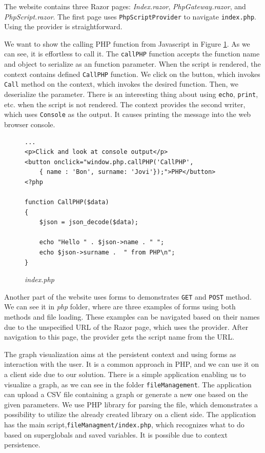 The website contains three Razor pages: \textit{Index.razor}, \textit{PhpGateway.razor}, and \textit{PhpScript.razor}.
The first page uses \texttt{PhpScriptProvider} to navigate \texttt{index.php}.
Using the provider is straightforward.
\par
We want to show the calling PHP function from Javascript in Figure \ref{img26:index}.
As we can see, it is effortless to call it.
The \texttt{callPHP} function accepts the function name and object to serialize as an function parameter.
When the script is rendered, the context contains defined \texttt{CallPHP} function.
We click on the button, which invokes \texttt{Call} method on the context, which invokes the desired function.
Then, we deserialize the parameter.
There is an interesting thing about using \texttt{echo}, \texttt{print}, etc. when the script is not rendered.
The context provides the second writer, which uses \texttt{Console} as the output.
It causes printing the message into the web browser console.
\begin{figure}
\begin{lstlisting}
...
<p>Click and look at console output</p>
<button onclick="window.php.callPHP('CallPHP',
	{ name : 'Bon', surname: 'Jovi'});">PHP</button>
<?php

function CallPHP($data)
{
    $json = json_decode($data); 

	echo "Hello " . $json->name . " ";
	echo $json->surname .  " from PHP\n";
}
\end{lstlisting}
\caption{\textit{index.php}}
\label{img26:index}
\end{figure}
\par
Another part of the website uses forms to demonstrates \texttt{GET} and \texttt{POST} method.
We can see it in \textit{php} folder, where are three examples of forms using both methods and file loading.
These examples can be navigated based on their names due to the unspecified URL of the Razor page, which uses the provider.
After navigation to this page, the provider gets the script name from the URL.
\par
The graph visualization aims at the persistent context and using forms as interaction with the user.
It is a common approach in PHP, and we can use it on a client side due to our solution.
There is a simple application enabling us to visualize a graph, as we can see in the folder \texttt{fileManagement}.
The application can upload a CSV file containing a graph or generate a new one based on the given parameters.
We use PHP library for parsing the file, which demonstrates a possibility to utilize the already created library on a client side.
The application has the main script,\texttt{fileManagment/index.php}, which recognizes what to do based on superglobals and saved variables.
It is possible due to context persistence.

